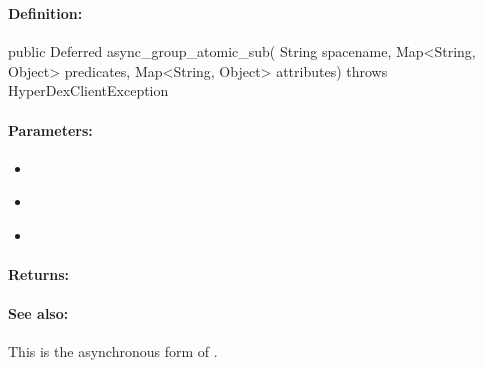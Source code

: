 \pagebreak
\subsubsection{}
\label{api:java:async_group_atomic_sub}


\paragraph{Definition:}
\begin{javacode}
public Deferred async_group_atomic_sub(
        String spacename,
        Map<String, Object> predicates,
        Map<String, Object> attributes) throws HyperDexClientException
\end{javacode}

\paragraph{Parameters:}
\begin{itemize}[noitemsep]
\item {}\\

\item {}\\

\item {}\\

\end{itemize}

\paragraph{Returns:}


\paragraph{See also:}  This is the asynchronous form of .

\pagebreak
\subsubsection{}
\label{api:java:atomic_mul}


